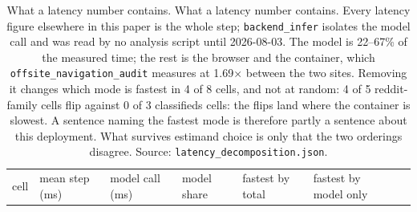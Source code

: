 \begin{table}[tp]
\centering
\caption{What a latency number contains. What a latency number contains. Every latency figure elsewhere in this paper is the whole step; \texttt{backend\_infer} isolates the model call and was read by no analysis script until 2026-08-03. The model is 22--67\% of the measured time; the rest is the browser and the container, which \texttt{offsite\_navigation\_audit} measures at 1.69× between the two sites. Removing it changes which mode is fastest in 4 of 8 cells, and not at random: 4 of 5 reddit-family cells flip against 0 of 3 classifieds cells: the flips land where the container is slowest. A sentence naming the fastest mode is therefore partly a sentence about this deployment. What survives estimand choice is only that the two orderings disagree. Source: \texttt{latency\_decomposition.json}.}
\label{tab:t11}
\footnotesize
\setlength{\tabcolsep}{3pt}
\begin{tabular}{@{}
  >{\raggedright\arraybackslash}p{}
  >{\raggedright\arraybackslash}p{}
  >{\raggedright\arraybackslash}p{}
  >{\raggedright\arraybackslash}p{}
  >{\raggedright\arraybackslash}p{}
  >{\raggedright\arraybackslash}p{}
  >{\raggedright\arraybackslash}p{}@{}}
\toprule
\begin{minipage}[b]{\linewidth}\raggedright
cell
\end{minipage} & \begin{minipage}[b]{\linewidth}\raggedright
mean step (ms)
\end{minipage} & \begin{minipage}[b]{\linewidth}\raggedright
model call (ms)
\end{minipage} & \begin{minipage}[b]{\linewidth}\raggedright
model share
\end{minipage} & \begin{minipage}[b]{\linewidth}\raggedright
fastest by total
\end{minipage} & \begin{minipage}[b]{\linewidth}\raggedright
fastest by model only
\end{minipage} & \begin{minipage}[b]{\linewidth}\raggedright

\end{minipage}
\end{tabular}
\end{table}
